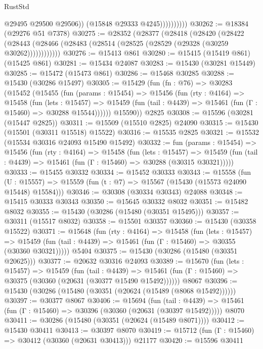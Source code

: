 \begin{lexlean}{RustStd}
\begin{coremodule}
                          @29495
                          @29500
                          @29506))
                      (@15848 @29333 @4245))))))))))
@30262 := @18384 (@29276 @51 @7378)
@30275 := @28352
    (@28377
      (@28418
        (@28420
          (@28422 (@28443 (@28466 (@28483 (@28514 (@28525 (@28529 (@29328 (@30259 @30262))))))))))))
@30276 := @15413 @861
@30280 := @15415 (@15419 @861) (@15425 @861)
@30281 := @15434 @24087
@30283 := @15430 (@30281 @15449)
@30285 := @15472 (@15473 @861)
@30286 := @15468 @30285
@30288 := @15430 (@30286 @15497)
@30305 := @15429
    (fun (fn : @76) =>
    @30283
      (@15452
        (@15455
          (fun (params : @15454) =>
          @15456
            (fun (rty : @4164) =>
            @15458
              (fun (lets : @15457) =>
              @15459 (fun (tail : @4439) => @15461 (fun (Γ : @15460) => @30288 @15544))))))
        @15590))
    @2825
@30308 := @15596 (@30281 (@15447 @2825))
@30311 := @15509 (@15510 @2825) @24090
@30315 := @15430 (@15501 (@30311 @15518) @15522)
@30316 := @15535 @2825
@30321 := @15532 (@15534 @30316 @24093 @15490 @15492)
@30332 := fun (params : @15454) =>
  @15456
    (fun (rty : @4164) =>
    @15458
      (fun (lets : @15457) =>
      @15459 (fun (tail : @4439) => @15461 (fun (Γ : @15460) => @30288 (@30315 @30321)))))
@30333 := @15455 @30332
@30334 := @15452 @30333
@30343 := @15558
    (fun (U : @15557) => @15559 (fun (t : @7) => @15567 (@15430 (@15573 @24090 @15448) @15584)))
@30346 := @30308 (@30334 @30343) @24088
@30348 := @15415 @30333 @30343
@30350 := @15645 @30332 @8032
@30351 := @15482 @8032
@30355 := @15430 (@30286 (@15480 (@30351 @15495)))
@30357 := @30311 (@15517 @8032)
@30358 := @15501 @30357
@30360 := @15430 (@30358 @15522)
@30371 := @15648
    (fun (rty : @4164) =>
    @15458
      (fun (lets : @15457) =>
      @15459 (fun (tail : @4439) => @15461 (fun (Γ : @15460) => @30355 (@30360 @30321)))))
    @5404
@30375 := @15430 (@30286 (@15480 (@30351 @20625)))
@30377 := @20632 @30316 @24093
@30389 := @15670
    (fun (lets : @15457) =>
    @15459
      (fun (tail : @4439) =>
      @15461 (fun (Γ : @15460) => @30375 (@30360 (@20631 (@30377 @15490 @15492))))))
    @8067
@30396 := @15430 (@30286 (@15480 (@30351 (@20624 (@15489 (@8068 @15492))))))
@30397 := @30377 @8067
@30406 := @15694
    (fun (tail : @4439) => @15461 (fun (Γ : @15460) => @30396 (@30360 (@20631 (@30397 @15492)))))
    @8070
@30411 := @30286 (@15480 (@30351 (@20624 (@15489 @8071))))
@30412 := @15430 @30411
@30413 := @30397 @8070
@30419 := @15712 (fun (Γ : @15460) => @30412 (@30360 (@20631 @30413))) @21177
@30420 := @15596 @30411

\end{coremodule}
\end{lexlean}
